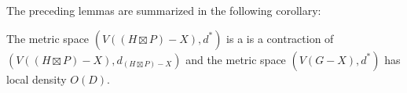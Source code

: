\documentclass{patmorin}
\renewcommand{\ge}{\geqslant}
\newcommand{\david}[1]{{\color{orange} David: #1}}
\newcommand{\pat}[1]{\textcolor{Maroon}{Pat: #1}}
\begin{document}
The preceding lemmas are summarized in the following corollary:

\begin{cor}
  The metric space $(V((H\boxtimes P)-X), d^*)$ is a is a contraction of $(V((H\boxtimes P)-X), d_{(H\boxtimes P)-X})$ and the metric space $(V(G-X),d^*)$ has local density $O(D)$.
\end{cor}

%
%









\end{document}
